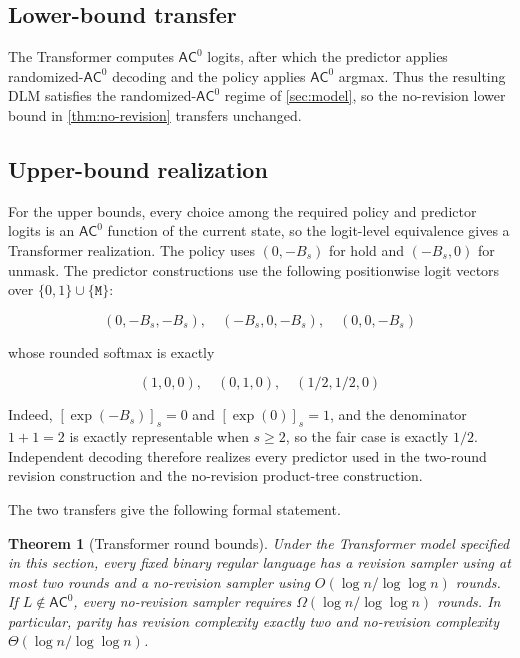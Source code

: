 \documentclass[10pt]{article}
\newtheorem{theorem}{Theorem}[section]
\theoremstyle{definition}
\newcommand{\AC}{\mathsf{AC}}
\newcommand{\bits}{\{0,1\}}
\newcommand{\mask}{\mathtt{M}}
\begin{document}
\subsection{Lower-bound transfer}

The Transformer computes $\AC^0$ logits, after which the predictor applies
randomized-$\AC^0$ decoding and the policy applies $\AC^0$ argmax.  Thus the
resulting DLM satisfies the randomized-$\AC^0$ regime of \cref{sec:model}, so
the no-revision lower bound in \cref{thm:no-revision} transfers unchanged.

\subsection{Upper-bound realization}

For the upper bounds, every choice among the required policy and predictor
logits is an $\AC^0$ function of the current state, so the logit-level
equivalence gives a Transformer realization.  The policy uses $(0,-B_s)$ for
hold and $(-B_s,0)$ for unmask.  The predictor constructions use the following
positionwise logit vectors over $\bits\cup\{\mask\}$:

\begin{equation}
 (0,-B_s,-B_s),\quad(-B_s,0,-B_s),\quad(0,0,-B_s)
\end{equation}

whose rounded softmax is exactly

\begin{equation}
 (1,0,0),\quad(0,1,0),\quad(1/2,1/2,0)
\end{equation}

Indeed, $[\exp(-B_s)]_s=0$ and $[\exp(0)]_s=1$, and the denominator $1+1=2$
is exactly representable when $s\ge2$, so the fair case is exactly $1/2$.
Independent decoding therefore realizes every predictor used in the
two-round revision construction and the no-revision product-tree construction.

The two transfers give the following formal statement.

\begin{theorem}[Transformer round bounds]
\label{thm:transformer-bounds}
Under the Transformer model specified in this section, every fixed binary
regular language has a revision sampler using at most two rounds and a
no-revision sampler using $O(\log n/\log\log n)$ rounds.  If
$L\notin\AC^0$, every no-revision sampler requires
$\Omega(\log n/\log\log n)$ rounds.  In particular, parity has revision
complexity exactly two and no-revision complexity
$\Theta(\log n/\log\log n)$.
\end{theorem}
\end{document}
